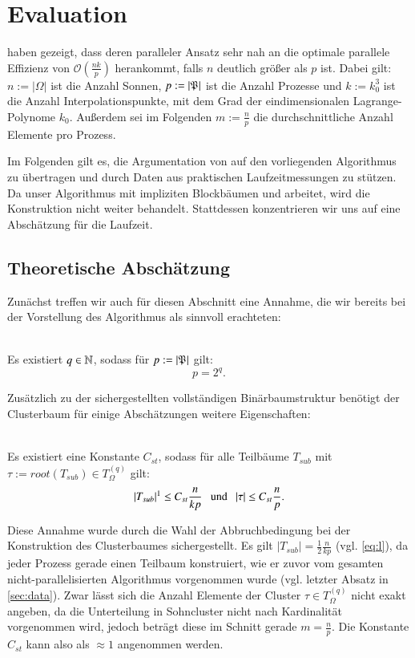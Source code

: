 \chapter{Evaluation}
\label{chp:eval}
  \citet{distrh2} haben gezeigt, dass deren paralleler Ansatz sehr nah an die optimale parallele Effizienz von $\mathcal{O}(\frac{nk}{p})$ herankommt, falls $n$ deutlich größer als $p$ ist.
  Dabei gilt: $n := |\Omega|$ ist die Anzahl Sonnen, $p := |\mathfrak{P}|$ ist die Anzahl Prozesse und $k := k_0^3$ ist die Anzahl Interpolationspunkte, mit dem Grad der eindimensionalen Lagrange-Polynome 
  $k_0$. Außerdem sei im Folgenden $m := \frac{n}{p}$ die durchschnittliche Anzahl Elemente pro Prozess.
  
  Im Folgenden gilt es, die Argumentation von \citet{distrh2} auf den vorliegenden Algorithmus zu übertragen und durch Daten aus praktischen Laufzeitmessungen zu stützen. Da unser Algorithmus 
  mit impliziten Blockbäumen und \hquad arbeitet, wird die Konstruktion nicht weiter behandelt. Stattdessen konzentrieren wir uns auf eine Abschätzung für die Laufzeit.
  
  \section{Theoretische Abschätzung}
  \label{sec:theo}
  
  Zunächst treffen wir auch für diesen Abschnitt eine Annahme, die wir bereits bei der Vorstellung des Algorithmus als sinnvoll erachteten:
  \begin{ann} \ \\
  \label{ann:nodes}
    Es existiert $q \in \mathbb{N}$, sodass für $p := \left| \mathfrak{P} \right|$ gilt:
    \[ p = 2^q. \]
  \end{ann}
  
  Zusätzlich zu der sichergestellten vollständigen Binärbaumstruktur benötigt der Clusterbaum für einige Abschätzungen weitere Eigenschaften:
  
  \begin{ann} \ \\
  \label{ann:tree}
    Es existiert eine Konstante $C_{st}$, sodass für alle Teilbäume $T_{sub}$ mit $\tau := root(T_{sub}) \in T_\Omega^{(q)}$ gilt:
    \[
     |T_{sub}|\footnotemark \leq C_{st} \frac{n}{kp} \ \ \text{ und } \ \ |\tau| \leq C_{st}\frac{n}{p}.
    \]
  \end{ann}
  
  Diese Annahme wurde durch die Wahl der Abbruchbedingung bei der Konstruktion des Clusterbaumes sichergestellt. Es gilt $|T_{sub}| = \frac{1}{2} \frac{n}{kp}$ (vgl. \autoref{eq:l}),
  da jeder Prozess gerade einen Teilbaum konstruiert, wie er zuvor vom gesamten nicht-parallelisierten Algorithmus vorgenommen wurde (vgl. letzter Absatz in \autoref{sec:data}). Zwar lässt sich die
  Anzahl Elemente der Cluster $\tau \in T_\Omega^{(q)}$ nicht exakt angeben, da die Unterteilung in Sohncluster nicht nach Kardinalität vorgenommen wird, jedoch beträgt diese im Schnitt gerade 
  $m = \frac{n}{p}$. Die Konstante $C_{st}$ kann also als $\approx 1$ angenommen werden.
  
